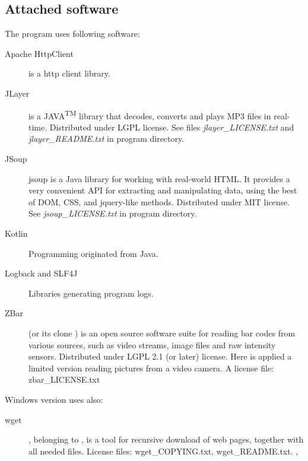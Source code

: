 \documentclass[polish,a4paper,11pt,oneside]{article}
\begin{document}
\subsection{Attached software}

The program uses following software:

\begin{description}
\item[Apache HttpClient]
  is a http client library.

\item[JLayer]
  is a JAVA\textsuperscript{TM} library that decodes, converts and plays MP3 files in real-time.
  Distributed under LGPL license.
  See files {\em jlayer\_LICENSE.txt} and {\em jlayer\_README.txt} in program directory.

\item[JSoup]
  jsoup is a Java library for working with real-world HTML.
  It provides a very convenient API for extracting and manipulating data,
  using the best of DOM, CSS, and jquery-like methods.
  Distributed under MIT license.
  See {\em jsoup\_LICENSE.txt} in program directory.

\item[Kotlin]
  Programming
  originated from Java.

\item[Logback and SLF4J]
  Libraries generating program logs.

\item[ZBar]
  (or its clone 
  )
  is an open source software suite for reading bar codes from various sources,
  such as video streams, image files and raw intensity sensors.
  Distributed under LGPL 2.1 (or later) license.
  Here is applied a limited version reading pictures from a video camera.
  A license file: zbar\_LICENSE.txt

\end{description}

Windows version uses also:
  
\begin{description}

\item[wget]
  ,
  belonging to ,
  is a tool for recursive download of web pages, together with all needed files.
  License files: wget\_COPYING.txt, wget\_README.txt.
  ,

\end{description}
\end{document}
